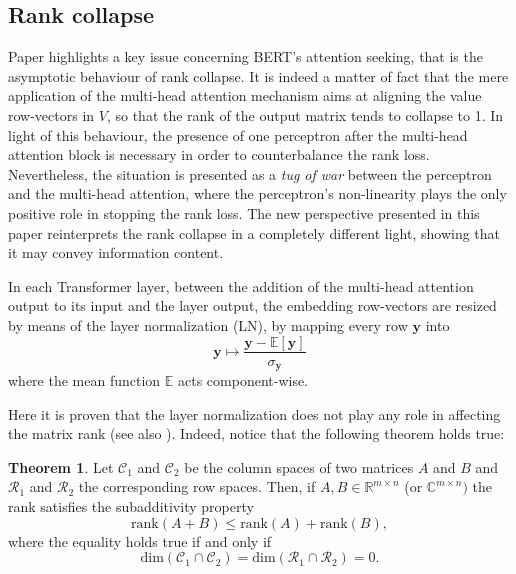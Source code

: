 \documentclass[11pt,a4paper,reqno]{amsart} %
\theoremstyle{definition}
\newtheorem{thm}[defn]{Theorem}
\numberwithin{equation}{section}          %
\begin{document}
\subsection{Rank collapse}

Paper \cite{attnot} highlights a key issue concerning BERT's attention seeking, that is the asymptotic behaviour of rank collapse.
It is indeed a matter of fact that the mere application of the multi-head attention mechanism aims at aligning the value row-vectors in $V$, so that the rank of the output matrix tends to collapse to 1. In light of this behaviour, the presence of one perceptron after the multi-head attention block is necessary in order to counterbalance the rank loss. Nevertheless, the situation is presented as a \textit{tug of war} between the perceptron and the multi-head attention, where the perceptron's non-linearity plays the only positive role in stopping the rank loss. The new perspective presented in this paper reinterprets the rank collapse in a completely different light, showing that it may convey information content. 

In each Transformer layer, between the addition of the multi-head attention output to its input and the layer output, the embedding row-vectors are resized by means of the layer normalization (LN), by mapping every row $\mathbf{y}$ into
\begin{equation}
\mathbf{y} \mapsto \frac{\mathbf{y} - \mathbb{E}[\mathbf{y}]}{\sigma_\mathbf{y}}
\end{equation}
where the mean function $\mathbb{E}$ acts component-wise.

Here it is proven that the layer normalization does not play any role in affecting the matrix rank (see also \cite{attnot}). Indeed, notice that the following theorem holds true:
\begin{thm}
\cite{bernstein2018} Let $\mathscr{C}_1$ and $\mathscr{C}_2$ be the column spaces of two matrices $A$ and $B$ and $\mathscr{R}_1$ and $\mathscr{R}_2$ the corresponding row spaces. Then, if $A,B \in \mathbb{R}^{m \times n}$ (or $\mathbb{C}^{m \times n})$ the rank satisfies the subadditivity property 
\begin{equation}
\mathrm{rank}(A+B) \leq \mathrm{rank}(A) + \mathrm{rank}(B),
\end{equation}
\noindent where the equality holds true if and only if
\begin{equation}
\mathrm{dim}(\mathscr{C}_1 \cap \mathscr{C}_2) = \mathrm{dim}(\mathscr{R}_1 \cap \mathscr{R}_2)=0.
\end{equation}
\end{thm}
\end{document}
